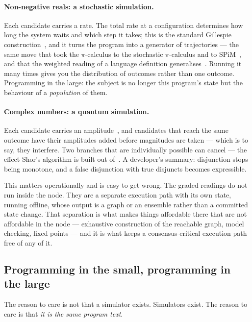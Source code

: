 \paragraph{Non-negative reals: a stochastic simulation.} Each candidate carries a
rate. The total rate at a configuration determines how long the system waits and
which step it takes; this is the standard Gillespie construction~\cite{Gillespie77}, and it turns
the program into a generator of trajectories --- the same move that took the
$\pi$-calculus to the stochastic $\pi$-calculus and to
SPiM~\cite{Priami95,PhillipsCardelli07}, and that the weighted reading of a
language definition generalises~\cite{WeightedGSLT}. Running it many times gives you
the distribution of outcomes rather than one outcome. Programming in the large:
the subject is no longer this program's state but the behaviour of a
\emph{population} of them.

\paragraph{Complex numbers: a quantum simulation.} Each candidate carries an
amplitude~\cite{GWQuantum}, and candidates that reach the same outcome have
their amplitudes added before magnitudes are taken --- which is to say, they interfere. Two
branches that are individually possible can cancel --- the effect Shor's
algorithm is built out of~\cite{Shor97}. A developer's summary:
disjunction stops being monotone, and a false disjunction with true disjuncts
becomes expressible.

\begin{remark}
\label{sec:simnotinterp}
This matters operationally and is easy to get wrong. The graded readings do not
run inside the node. They are a separate execution path with its own state,
running offline, whose output is a graph or an ensemble rather than a committed
state change. That separation is what makes things affordable there that are not
affordable in the node --- exhaustive construction of the reachable graph, model
checking, fixed points --- and it is what keeps a consensus-critical execution
path free of any of it.
\end{remark}

\subsection{Programming in the small, programming in the large}

The reason to care is not that a simulator exists. Simulators exist. The reason
to care is that \emph{it is the same program text}.

